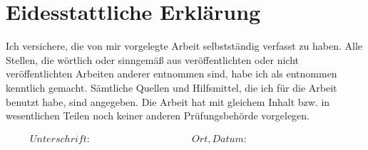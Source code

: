 \section*{Eidesstattliche Erklärung}

\vspace{1cm}
Ich versichere, die von mir vorgelegte Arbeit selbstständig verfasst zu haben. Alle Stellen, die wörtlich oder sinngemäß aus veröffentlichten oder nicht veröffentlichten Arbeiten anderer entnommen sind, 
habe ich als entnommen kenntlich gemacht. Sämtliche Quellen und Hilfsmittel, die ich für die Arbeit benutzt habe, sind angegeben. Die Arbeit hat mit gleichem Inhalt bzw. in wesentlichen 
Teilen noch keiner anderen Prüfungsbehörde vorgelegen.



\begin{displaymath}
\begin{array}{ll}
Unterschrift:~~~~~~~~~~~~~~~~~~~~~~~~~~~~~~~~~~~~~~~~~~
& Ort, Datum:~~~~~~~~~~~~~~~~~~~~~~~~~~~~~~~~~~~~~~~~~~
\end{array}
\end{displaymath}
